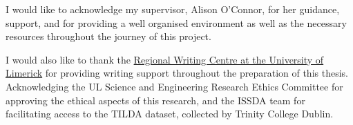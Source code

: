 

\begin{acknowledgements}      %

I would like to acknowledge my supervisor, Alison O'Connor, for her guidance, support, and for providing a well organised environment as well as the necessary resources throughout the journey of this project.

I would also like to thank the \href{https://www.ul.ie/regional-writing-centre}{Regional Writing Centre at the University of Limerick} for providing writing support throughout the preparation of this thesis. Acknowledging the \gls{UL} Science and Engineering Research Ethics Committee for approving the ethical aspects of this research, and the \gls{ISSDA} team for facilitating access to the \gls{TILDA} dataset, collected by Trinity College Dublin.

\end{acknowledgements}

